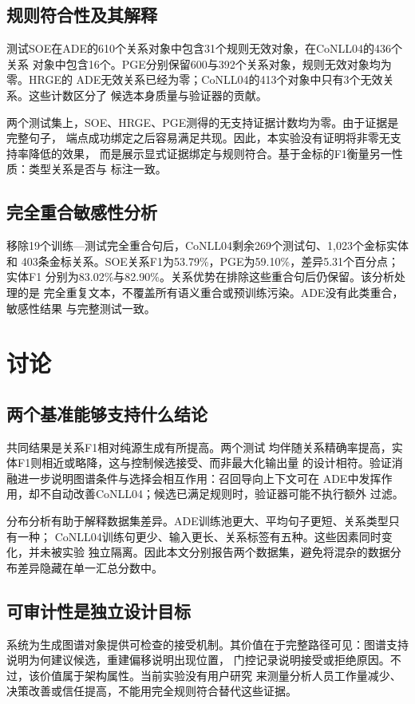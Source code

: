 \documentclass[12pt,a4paper,fontset=none]{ctexart}
\begin{document}
\subsection{规则符合性及其解释}
测试SOE在ADE的610个关系对象中包含31个规则无效对象，在CoNLL04的436个关系
对象中包含16个。PGE分别保留600与392个关系对象，规则无效对象均为零。HRGE的
ADE无效关系已经为零；CoNLL04的413个对象中只有3个无效关系。这些计数区分了
候选本身质量与验证器的贡献。

两个测试集上，SOE、HRGE、PGE测得的无支持证据计数均为零。由于证据是完整句子，
端点成功绑定之后容易满足共现。因此，本实验没有证明将非零无支持率降低的效果，
而是展示显式证据绑定与规则符合。基于金标的F1衡量另一性质：类型关系是否与
标注一致。

\subsection{完全重合敏感性分析}
移除19个训练—测试完全重合句后，CoNLL04剩余269个测试句、1,023个金标实体和
403条金标关系。SOE关系F1为53.79\%，PGE为59.10\%，差异5.31个百分点；实体F1
分别为83.02\%与82.90\%。关系优势在排除这些重合句后仍保留。该分析处理的是
完全重复文本，不覆盖所有语义重合或预训练污染。ADE没有此类重合，敏感性结果
与完整测试一致。

\section{讨论}
\label{sec:discussion}
\subsection{两个基准能够支持什么结论}
共同结果是关系F1相对纯源生成有所提高。两个测试
均伴随关系精确率提高，实体F1则相近或略降，这与控制候选接受、而非最大化输出量
的设计相符。验证消融进一步说明图谱条件与选择会相互作用：召回导向上下文可在
ADE中发挥作用，却不自动改善CoNLL04；候选已满足规则时，验证器可能不执行额外
过滤。

分布分析有助于解释数据集差异。ADE训练池更大、平均句子更短、关系类型只有一种；
CoNLL04训练句更少、输入更长、关系标签有五种。这些因素同时变化，并未被实验
独立隔离。因此本文分别报告两个数据集，避免将混杂的数据分布差异隐藏在单一汇总分数中。

\subsection{可审计性是独立设计目标}
系统为生成图谱对象提供可检查的接受机制。其价值在于完整路径可见：图谱支持说明为何建议候选，重建偏移说明出现位置，
门控记录说明接受或拒绝原因。不过，该价值属于架构属性。当前实验没有用户研究
来测量分析人员工作量减少、决策改善或信任提高，不能用完全规则符合替代这些证据。
\end{document}

